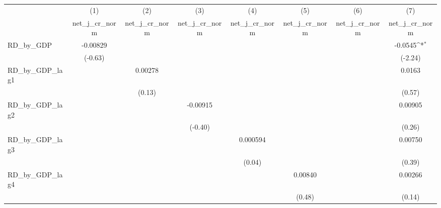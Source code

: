 {
\def\sym#1{\ifmmode^{#1}\else\(^{#1}\)\fi}
\begin{tabular}{l*{7}{c}}
\toprule
          &\multicolumn{1}{c}{(1)}&\multicolumn{1}{c}{(2)}&\multicolumn{1}{c}{(3)}&\multicolumn{1}{c}{(4)}&\multicolumn{1}{c}{(5)}&\multicolumn{1}{c}{(6)}&\multicolumn{1}{c}{(7)}\\
          &\multicolumn{1}{c}{net\_j\_cr\_norm}&\multicolumn{1}{c}{net\_j\_cr\_norm}&\multicolumn{1}{c}{net\_j\_cr\_norm}&\multicolumn{1}{c}{net\_j\_cr\_norm}&\multicolumn{1}{c}{net\_j\_cr\_norm}&\multicolumn{1}{c}{net\_j\_cr\_norm}&\multicolumn{1}{c}{net\_j\_cr\_norm}\\
\midrule
RD\_by\_GDP & -0.00829         &                  &                  &                  &                  &                  &  -0.0545\sym{*}  \\
          &  (-0.63)         &                  &                  &                  &                  &                  &  (-2.24)         \\
\addlinespace
RD\_by\_GDP\_lag1&                  &  0.00278         &                  &                  &                  &                  &   0.0163         \\
          &                  &   (0.13)         &                  &                  &                  &                  &   (0.57)         \\
\addlinespace
RD\_by\_GDP\_lag2&                  &                  & -0.00915         &                  &                  &                  &  0.00905         \\
          &                  &                  &  (-0.40)         &                  &                  &                  &   (0.26)         \\
\addlinespace
RD\_by\_GDP\_lag3&                  &                  &                  & 0.000594         &                  &                  &  0.00750         \\
          &                  &                  &                  &   (0.04)         &                  &                  &   (0.39)         \\
\addlinespace
RD\_by\_GDP\_lag4&                  &                  &                  &                  &  0.00840         &                  &  0.00266         \\
          &                  &                  &                  &                  &   (0.48)         &                  &   (0.14)         \\

\end{tabular}}

